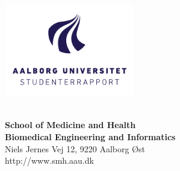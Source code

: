 {}
\thispagestyle{empty}

\begin{minipage}[t]{0.48\textwidth}
\vspace*{-25pt}			%
\includegraphics[height=4cm]{billeder/AAU-logo-stud-DK-RGB}
\end{minipage}
\hfill
\begin{minipage}[t]{0.48\textwidth}
{\small 
\textbf{\\ School of Medicine and Health  \\
Biomedical Engineering and Informatics}\\
Niels Jernes Vej 12, 9220 Aalborg Øst \\
http://www.smh.aau.dk}

\end{minipage}

\vspace*{1cm}

